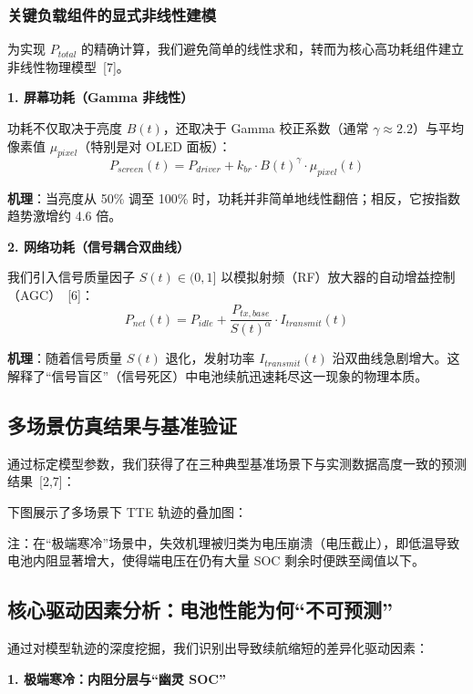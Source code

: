 \documentclass[11pt,a4paper]{ctexart}
\begin{document}
\subsubsection{关键负载组件的显式非线性建模}

为实现 $P_{total}$ 的精确计算，我们避免简单的线性求和，转而为核心高功耗组件建立非线性物理模型~[7]。

\textbf{1. 屏幕功耗（Gamma 非线性）}

功耗不仅取决于亮度 $B(t)$，还取决于 Gamma 校正系数（通常 $\gamma\approx 2.2$）与平均像素值 $\mu_{pixel}$（特别是对 OLED 面板）：
\begin{equation}
P_{screen}(t)=P_{driver}+k_{br}\cdot B(t)^{\gamma}\cdot\mu_{pixel}(t)
\end{equation}

\textbf{机理}：当亮度从 50\% 调至 100\% 时，功耗并非简单地线性翻倍；相反，它按指数趋势激增约 4.6 倍。

\textbf{2. 网络功耗（信号耦合双曲线）}

我们引入信号质量因子 $S(t)\in(0,1]$ 以模拟射频（RF）放大器的自动增益控制（AGC）~[6]：
\begin{equation}
P_{net}(t)=P_{idle}+\frac{P_{tx,base}}{S(t)^{\alpha}}\cdot I_{transmit}(t)
\end{equation}

\textbf{机理}：随着信号质量 $S(t)$ 退化，发射功率 $I_{transmit}(t)$ 沿双曲线急剧增大。这解释了“信号盲区”（信号死区）中电池续航迅速耗尽这一现象的物理本质。

\subsection{多场景仿真结果与基准验证}

通过标定模型参数，我们获得了在三种典型基准场景下与实测数据高度一致的预测结果~[2,7]：

下图展示了多场景下 TTE 轨迹的叠加图：

注：在“极端寒冷”场景中，失效机理被归类为电压崩溃（电压截止），即低温导致电池内阻显著增大，使得端电压在仍有大量 SOC 剩余时便跌至阈值以下。

\subsection{核心驱动因素分析：电池性能为何“不可预测”}

通过对模型轨迹的深度挖掘，我们识别出导致续航缩短的差异化驱动因素：

\textbf{1. 极端寒冷：内阻分层与“幽灵 SOC”}
\end{document}
